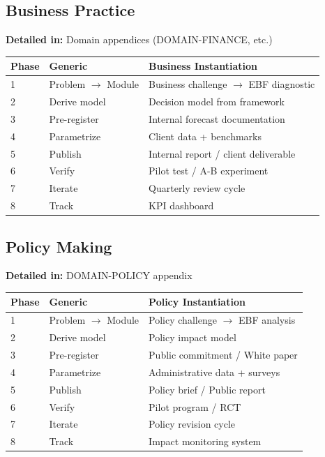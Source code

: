 \subsection{Business Practice}

\textbf{Detailed in:} Domain appendices (DOMAIN-FINANCE, etc.)

\begin{center}
\small
\begin{tabular}{@{}lll@{}}
\toprule
\textbf{Phase} & \textbf{Generic} & \textbf{Business Instantiation} \\
\midrule
1 & Problem $\to$ Module & Business challenge $\to$ EBF diagnostic \\
2 & Derive model & Decision model from framework \\
3 & Pre-register & Internal forecast documentation \\
4 & Parametrize & Client data + benchmarks \\
5 & Publish & Internal report / client deliverable \\
6 & Verify & Pilot test / A-B experiment \\
7 & Iterate & Quarterly review cycle \\
8 & Track & KPI dashboard \\
\bottomrule
\end{tabular}
\end{center}

\subsection{Policy Making}

\textbf{Detailed in:} DOMAIN-POLICY appendix

\begin{center}
\small
\begin{tabular}{@{}lll@{}}
\toprule
\textbf{Phase} & \textbf{Generic} & \textbf{Policy Instantiation} \\
\midrule
1 & Problem $\to$ Module & Policy challenge $\to$ EBF analysis \\
2 & Derive model & Policy impact model \\
3 & Pre-register & Public commitment / White paper \\
4 & Parametrize & Administrative data + surveys \\
5 & Publish & Policy brief / Public report \\
6 & Verify & Pilot program / RCT \\
7 & Iterate & Policy revision cycle \\
8 & Track & Impact monitoring system \\
\bottomrule
\end{tabular}
\end{center}



